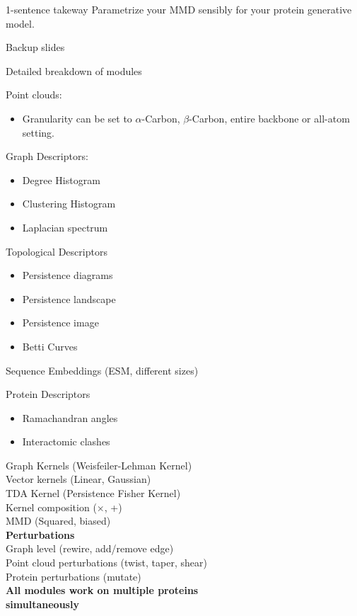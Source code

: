 \documentclass[aspectratio=169, 10pt, dvipsnames]{beamer}
\begin{document}
\begin{frame}[standout]{1-sentence takeway}
  Parametrize your MMD sensibly for your protein generative model.
\end{frame}

\begin{frame}[standout]
  Backup slides
\end{frame}

\begin{frame}[fragile]{Detailed breakdown of modules}
  \footnotesize{
  \begin{minipage}{.45\textwidth}
    Point clouds:
    \begin{itemize}
    \item Granularity can be set to $\alpha$-Carbon, $\beta$-Carbon, entire backbone or all-atom setting.
    \end{itemize}
    Graph Descriptors:
    \begin{itemize}
    \item Degree Histogram
    \item Clustering Histogram
    \item Laplacian spectrum
    \end{itemize}
    Topological Descriptors
    \begin{itemize}
      \item Persistence diagrams
      \item Persistence landscape
      \item Persistence image
      \item Betti Curves
    \end{itemize}
    Sequence Embeddings (ESM, different sizes)
  \end{minipage}
  \hfill
  \begin{minipage}{.45\textwidth}

    Protein Descriptors
      \begin{itemize}
      \item Ramachandran angles
      \item Interactomic clashes
      \end{itemize}
      Graph Kernels (Weisfeiler-Lehman Kernel)\\
      Vector kernels (Linear, Gaussian)\\
      TDA Kernel (Persistence Fisher Kernel)\\
      Kernel composition ($\times$, +)\\
      MMD (Squared, biased)\\
      \newline
      \textbf{Perturbations}\\
      Graph level (rewire, add/remove edge)\\
      Point cloud perturbations (twist, taper, shear)\\
      Protein perturbations (mutate)\\
      \textbf{All modules work on multiple proteins \\simultaneously}
  \end{minipage}
}
\end{frame}
\end{document}
